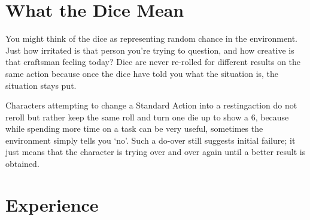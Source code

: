 \section{What the Dice Mean}

\begin{multicols}{2}

You might think of the dice as representing random chance in the environment. Just how irritated is that person you're trying to question, and how creative is that craftsman feeling today? Dice are never re-rolled for different results on the same action because once the dice have told you what the situation is, the situation stays put.

Characters attempting to change a Standard Action into a \gls{restingaction} do not reroll but rather keep the same roll and turn one die up to show a 6, because while spending more time on a task can be very useful, sometimes the environment simply tells you `no'.
Such a do-over still suggests initial failure; it just means that the character is trying over and over again until a better result is obtained.

\end{multicols}

\label{xp}\section{Experience}

